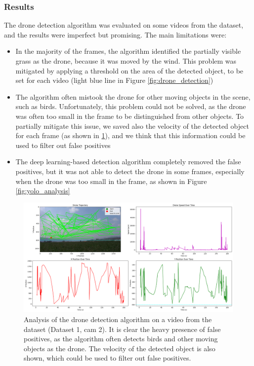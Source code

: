 \documentclass[11pt]{article}
\begin{document}
\subsubsection*{Results}
\label{sec:drone_detection_results}

The drone detection algorithm was evaluated on some videos from the dataset, and the results were imperfect but promising. The main limitations were:

\begin{itemize}
    \item In the majority of the frames, the algorithm identified the partially visible grass as the drone, because it was moved by the wind. This problem was mitigated by applying a threshold on the area of the detected object, to be set for each video (light blue line in Figure \ref{fig:drone_detection})
    \item The algorithm often mistook the drone for other moving objects in the scene, such as birds. Unfortunately, this problem could not be solved, as the drone was often too small in the frame to be distinguished from other objects. To partially mitigate this issue, we saved also the velocity of the detected object for each frame (as shown in \ref{fig:detection_plots}), and we think that this information could be used to filter out false positives
    \item The deep learning-based detection algorithm completely removed the false positives, but it was not able to detect the drone in some frames, especially when the drone was too small in the frame, as shown in Figure \ref{fig:yolo_analysis}
\end{itemize}

\begin{figure}[H]
    \centering
    \includegraphics[width=\textwidth]{imgs/drone_tracking_output_trajectory.png}
    \caption{Analysis of the drone detection algorithm on a video from the dataset (Dataset 1, cam 2). It is clear the heavy presence of false positives, as the algorithm often detects birds and other moving objects as the drone. The velocity of the detected object is also shown, which could be used to filter out false positives.}
    \label{fig:detection_plots}
\end{figure}
\end{document}
